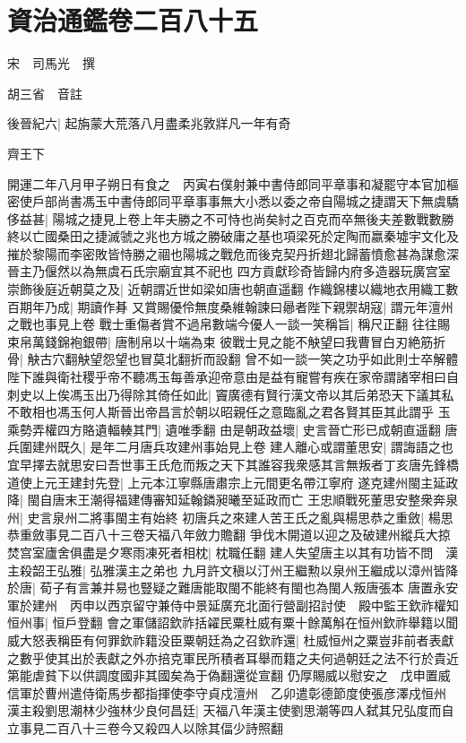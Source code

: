 \chapter{資治通鑑卷二百八十五}
宋　司馬光　撰

胡三省　音註

後晉紀六|{
	起旃蒙大荒落八月盡柔兆敦牂凡一年有奇}


齊王下

開運二年八月甲子朔日有食之　丙寅右僕射兼中書侍郎同平章事和凝罷守本官加樞密使戶部尚書馮玉中書侍郎同平章事事無大小悉以委之帝自陽城之捷謂天下無虞驕侈益甚|{
	陽城之捷見上卷上年夫勝之不可恃也尚矣紂之百克而卒無後夫差數戰數勝終以亡國桑田之捷滅虢之兆也方城之勝破庸之基也項梁死於定陶而嬴秦墟宇文化及摧於黎陽而李密敗皆恃勝之祻也陽城之戰危而後克契丹折翅北歸蓄憤愈甚為謀愈深晉主乃偃然以為無虞石氏宗廟宜其不祀也}
四方貢獻珍奇皆歸内府多造器玩廣宫室崇飾後庭近朝莫之及|{
	近朝謂近世如梁如唐也朝直遥翻}
作織錦樓以織地衣用織工數百期年乃成|{
	期讀作朞}
又賞賜優伶無度桑維翰諫曰曏者陛下親禦胡寇|{
	謂元年澶州之戰也事見上卷}
戰士重傷者賞不過帛數端今優人一談一笑稱旨|{
	稱尺正翻}
往往賜束帛萬錢錦袍銀帶|{
	唐制帛以十端為束}
彼戰士見之能不觖望曰我曹冒白刃絶筋折骨|{
	觖古穴翻觖望怨望也冒莫北翻折而設翻}
曾不如一談一笑之功乎如此則士卒解體陛下誰與衛社稷乎帝不聽馮玉每善承迎帝意由是益有寵嘗有疾在家帝謂諸宰相曰自刺史以上俟馮玉出乃得除其倚任如此|{
	竇廣德有賢行漢文帝以其后弟恐天下議其私不敢相也馮玉何人斯晉出帝昌言於朝以昭親任之意臨亂之君各賢其臣其此謂乎}
玉乘勢弄權四方賂遺輻輳其門|{
	遺唯季翻}
由是朝政益壞|{
	史言晉亡形已成朝直遥翻}
唐兵圍建州既久|{
	是年二月唐兵攻建州事始見上卷}
建人離心或謂董思安|{
	謂誨語之也}
宜早擇去就思安曰吾世事王氏危而叛之天下其誰容我衆感其言無叛者丁亥唐先鋒橋道使上元王建封先登|{
	上元本江寧縣唐肅宗上元間更名帶江寧府}
遂克建州閩主延政降|{
	閩自唐末王潮得福建傳審知延翰鏻昶曦至延政而亡}
王忠順戰死董思安整衆奔泉州|{
	史言泉州二將事閩主有始終}
初唐兵之來建人苦王氏之亂與楊思恭之重斂|{
	楊思恭重斂事見二百八十三卷天福八年斂力贍翻}
爭伐木開道以迎之及破建州縱兵大掠焚宫室廬舍俱盡是夕寒雨凍死者相枕|{
	枕職任翻}
建人失望唐主以其有功皆不問　漢主殺韶王弘雅|{
	弘雅漢主之弟也}
九月許文稹以汀州王繼勲以泉州王繼成以漳州皆降於唐|{
	荀子有言兼并易也豎疑之難唐能取閩不能終有閩也為閩人叛唐張本}
唐置永安軍於建州　丙申以西京留守兼侍中景延廣充北面行營副招討使　殿中監王欽祚權知恒州事|{
	恒戶登翻}
會之軍儲詔欽祚括糴民粟杜威有粟十餘萬斛在恒州欽祚舉籍以聞威大怒表稱臣有何罪欽祚籍没臣粟朝廷為之召欽祚還|{
	杜威恒州之粟豈非前者表獻之數乎使其出於表獻之外亦掊克軍民所積者耳舉而籍之夫何過朝廷之法不行於貴近第能虐貧下以供調度國非其國矣為于偽翻還從宣翻}
仍厚賜威以慰安之　戊申置威信軍於曹州遣侍衛馬步都指揮使李守貞戍澶州　乙卯遣彰德節度使張彦澤戍恒州　漢主殺劉思潮林少強林少良何昌廷|{
	天福八年漢主使劉思潮等四人弑其兄弘度而自立事見二百八十三卷今又殺四人以除其偪少詩照翻}
